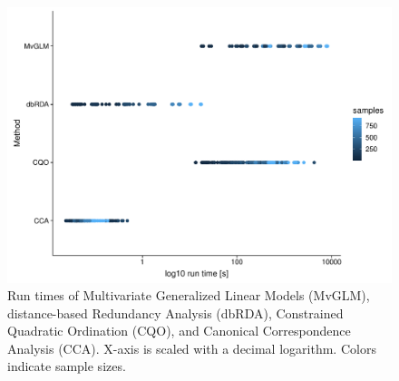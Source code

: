 \documentclass[a4paper,11pt]{article}
\begin{document}
    \begin{figure}[!htbp]
        \centering
        \includegraphics[scale =0.6]{figures/run_timeplot.pdf}
        \caption{Run times of Multivariate Generalized Linear Models (MvGLM), distance-based Redundancy Analysis (dbRDA), Constrained Quadratic Ordination (CQO), and Canonical Correspondence Analysis (CCA). X-axis is scaled with a decimal logarithm. Colors indicate sample sizes.}
        \label{fig:runtime}
    \end{figure}{}

\end{document}
